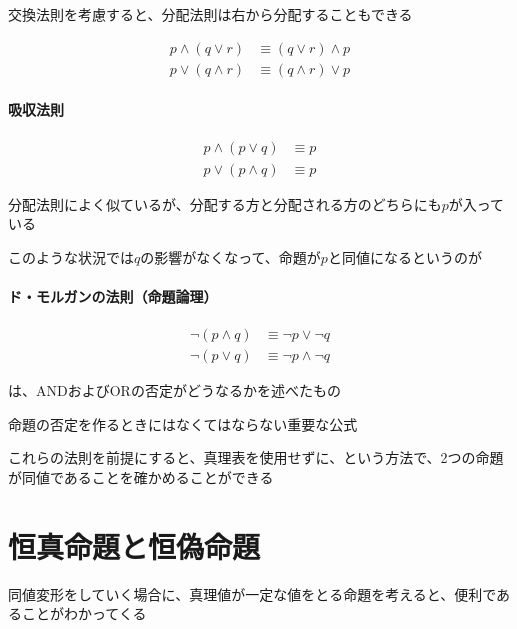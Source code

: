\documentclass[../book_ronri-and-set]{subfiles}
\begin{document}
交換法則を考慮すると、分配法則は右から分配することもできる

\begin{align*}
  p \land (q \lor r) & \equiv (q \lor r) \land p \\
  p \lor (q \land r) & \equiv (q \land r) \lor p
\end{align*}

\sectionline

\begin{oframed}
  \paragraph{吸収法則}
  \begin{align*}
    p \land (p \lor q) & \equiv p \\
    p \lor (p \land q) & \equiv p
  \end{align*}
\end{oframed}

分配法則によく似ているが、分配する方と分配される方のどちらにも$p$が入っている

このような状況では$q$の影響がなくなって、命題が$p$と同値になるというのが

\sectionline

\begin{oframed}
  \paragraph{ド・モルガンの法則（命題論理）}
  \begin{align*}
    \neg (p \land q) & \equiv \neg p \lor \neg q  \\
    \neg (p \lor q)  & \equiv \neg p \land \neg q
  \end{align*}
\end{oframed}

は、ANDおよびORの否定がどうなるかを述べたもの

命題の否定を作るときにはなくてはならない重要な公式

\sectionline

これらの法則を前提にすると、真理表を使用せずに、という方法で、2つの命題が同値であることを確かめることができる

\sectionline
\section{恒真命題と恒偽命題}

同値変形をしていく場合に、真理値が一定な値をとる命題を考えると、便利であることがわかってくる
\end{document}
